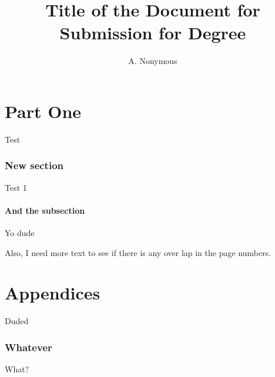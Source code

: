 \documentclass[phd,lof,lot]{cwru}
\title{Title of the Document for Submission for Degree}
\author{A. Nonymous}
\begin{document}
\CWRUabstract{}

\CWRUpreamble{}

\part{Part One}

Test

\section{New section}

Test 1

\subsection{And the subsection}

Yo dude


\vfill

Also, I need more text to see if there is any over lap in the page numbers.

\appendix
\part{Appendices}

Duded

\section{Whatever}

What?

\end{document}
